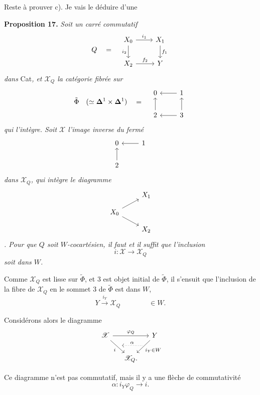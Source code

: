 \documentclass[11pt]{article}
\newcommand{\printedpage}[1]{\marginpar{\footnotesize p.~#1}}
\newcommand{\msp}[1]{\marginpar{\footnotesize [#1]}}
\newcommand{\cX}{\mathscr{X}}
\begin{document}
\printedpage{150}

Reste à prouver c). Je vais le déduire d'une

\textbf{Proposition 17.} \textit{Soit un carré commutatif}
\[
Q \quad = \quad
\begin{tikzcd}[ampersand replacement=\&]
X_0 \arrow[r, "i_1"] \arrow[d, "i_2"'] \& X_1 \arrow[d, "f_1"] \\
X_2 \arrow[r, "f_2"] \& Y
\end{tikzcd}
\]
\textit{dans} Cat\textit{, et $\cX_Q$ la catégorie fibrée sur}
\[
\tilde{\Phi} \quad (\simeq \mathbf{\Delta}^1 \times \mathbf{\Delta}^1) \quad = \quad
\begin{tikzcd}[ampersand replacement=\&]
0 \& 1 \arrow[l] \\
2 \arrow[u] \& 3 \arrow[l] \arrow[u]
\end{tikzcd}
\]
\textit{qui l'intègre. Soit $\cX$ l'image inverse du fermé}
\[
\begin{tikzcd}[ampersand replacement=\&]
0 \& 1 \arrow[l] \\
2 \arrow[u] \&
\end{tikzcd}
\]
\msp{page 235}
\textit{dans $\cX_Q$, qui intègre le diagramme}
\[
\begin{tikzcd}[ampersand replacement=\&, row sep=small]
 \& X_1 \\
X_0 \arrow[ru] \arrow[rd] \& \\
 \& X_2
\end{tikzcd}
\]
\textit{. Pour que $Q$ soit $W$-cocartésien, il faut et il suffit que l'inclusion}
\[
i : \cX \longrightarrow \cX_Q
\]
\textit{soit dans $W$.}

Comme $\cX_Q$ est lisse sur $\tilde{\Phi}$, et 3 est objet initial de $\tilde{\Phi}$, il s'ensuit que l'inclusion de la fibre de $\cX_Q$ en le sommet 3 de $\tilde{\Phi}$ est dans $W$,
\[
Y \xrightarrow{i_Y} \cX_Q \qquad\qquad \in W.
\]

Considérons alors le diagramme
\[
\begin{tikzcd}[ampersand replacement=\&, column sep=small]
\cX \arrow[rr, "\varphi_Q"] \arrow[rd, "i"', ""{name=direct,pos=.55,above right}] \& \& Y \arrow[ld, "i_Y\in W", ""{name=via,pos=.30,below left}] \\
 \& \cX_Q. \& \arrow[from=via,to=direct,dotted,shorten <=1pt,shorten >=1pt,"\alpha"']
\end{tikzcd}
\]

\printedpage{151}

Ce diagramme n'est pas commutatif, mais il y a une flèche de commutativité
\[
\alpha : i_Y\varphi_Q \longrightarrow i.
\]
\end{document}
